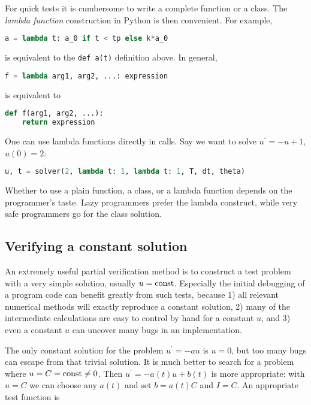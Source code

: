 \documentclass[graybox,sectrefs,envcountresetchap,open=right,final]{svmonodo}
\begin{document}

For quick tests it is cumbersome to write a complete function or a class.
The \emph{lambda function} construction in Python is then convenient. For example,
\begin{lstlisting}[language=Python,style=blue1_bluegreen]
a = lambda t: a_0 if t < tp else k*a_0
\end{lstlisting}
is equivalent to the \texttt{def a(t)} definition above. In general,
\begin{lstlisting}[language=Python,style=blue1_bluegreen]
f = lambda arg1, arg2, ...: expression
\end{lstlisting}
is equivalent to
\begin{lstlisting}[language=Python,style=blue1_bluegreen]
def f(arg1, arg2, ...):
    return expression
\end{lstlisting}
One can use lambda functions directly in calls. Say we want to
solve $u^{\prime}=-u+1$, $u(0)=2$:
\begin{lstlisting}[language=Python,style=blue1_bluegreen]
u, t = solver(2, lambda t: 1, lambda t: 1, T, dt, theta)
\end{lstlisting}

Whether to use a plain function, a class, or a lambda function depends
on the programmer's taste. Lazy programmers prefer the lambda construct, while
very safe programmers go for the class solution.

\subsection{Verifying a constant solution}
\label{decay:verify:trivial}

An extremely useful partial verification method is to construct a test
problem with a very simple solution, usually $u=\hbox{const}$.
Especially the initial debugging of a program code can benefit greatly
from such tests, because 1) all relevant numerical methods will
exactly reproduce a constant solution, 2) many of the intermediate
calculations are easy to control by hand for a constant $u$, and 3) even a
constant $u$ can uncover many bugs in an implementation.

The only constant solution for the problem $u^{\prime}=-au$ is $u=0$, but too
many bugs can escape from that trivial solution.  It is much better to
search for a problem where $u=C=\hbox{const}\neq 0$.  Then $u^{\prime}=-a(t)u
+ b(t)$ is more appropriate: with $u=C$ we can choose any $a(t)$ and
set $b=a(t)C$ and $I=C$. An appropriate test function is
\end{document}
